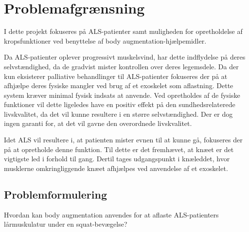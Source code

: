 \section{Problemafgrænsning}
I dette projekt fokuseres på ALS-patienter samt muligheden for opretholdelse af kropsfunktioner ved benyttelse af body augmentation-hjælpemidler. 

Da ALS-patienter oplever progressivt muskelsvind, har dette indflydelse på deres selvstændighed, da de gradvist mister kontrollen over deres legemsdele. Da der kun eksisterer palliative behandlinger til ALS-patienter fokuseres der på at afhjælpe deres fysiske mangler ved brug af et exoskelet som aflastning. Dette system kræver minimal fysisk indsats at anvende. 
Ved opretholdes af de fysiske funktioner vil dette ligeledes have en positiv effekt på den sundhedsrelaterede livskvalitet, da det vil kunne resultere i en større selvstændighed. Der er dog ingen garanti for, at det vil gavne den overordnede livskvalitet.  

Idet ALS vil resultere i, at patienten mister evnen til at kunne gå, fokuseres der på at opretholde denne funktion. Til dette er det fremhævet, at knæet er det vigtigste led i forhold til gang. Dertil tages udgangspunkt i knæleddet, hvor musklerne omkringliggende knæet afhjælpes ved anvendelse af et exoskelet.

\subsection{Problemformulering}
Hvordan kan body augmentation anvendes for at aflaste ALS-patienters lårmuskulatur under en squat-bevægelse?